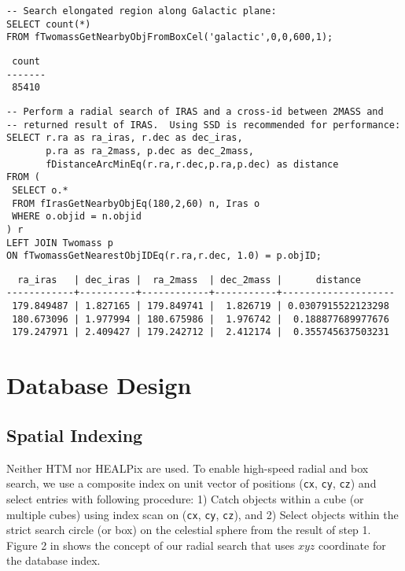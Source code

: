 \begin{verbatim}
-- Search elongated region along Galactic plane:
SELECT count(*) 
FROM fTwomassGetNearbyObjFromBoxCel('galactic',0,0,600,1);
\end{verbatim}

{\small
\begin{verbatim}
 count 
-------
 85410
\end{verbatim}
}

{\small
\begin{verbatim}
-- Perform a radial search of IRAS and a cross-id between 2MASS and
-- returned result of IRAS.  Using SSD is recommended for performance:
SELECT r.ra as ra_iras, r.dec as dec_iras,
       p.ra as ra_2mass, p.dec as dec_2mass,
       fDistanceArcMinEq(r.ra,r.dec,p.ra,p.dec) as distance
FROM (
 SELECT o.*
 FROM fIrasGetNearbyObjEq(180,2,60) n, Iras o
 WHERE o.objid = n.objid
) r
LEFT JOIN Twomass p
ON fTwomassGetNearestObjIDEq(r.ra,r.dec, 1.0) = p.objID;
\end{verbatim}
}

{\small
\begin{verbatim}
  ra_iras   | dec_iras |  ra_2mass  | dec_2mass |      distance      
------------+----------+------------+-----------+--------------------
 179.849487 | 1.827165 | 179.849741 |  1.826719 | 0.0307915522123298
 180.673096 | 1.977994 | 180.675986 |  1.976742 |  0.188877689977676
 179.247971 | 2.409427 | 179.242712 |  2.412174 |  0.355745637503231
\end{verbatim}
}


\section{Database Design}

\subsection{Spatial Indexing}

Neither HTM \citep{kun_2000} nor HEALPix \citep{gor_2005} are used.
To enable high-speed radial and box search,
we use a composite index on unit vector of positions 
({\tt cx}, {\tt cy}, {\tt cz}) and select entries with following procedure:
1) Catch objects within a cube (or multiple cubes) 
using index scan on ({\tt cx}, {\tt cy}, {\tt cz}), and
2) Select objects within the strict search circle (or box) on the celestial
sphere from the result of step 1.
Figure 2 in \citet{yam_2011a} shows the concept of our radial search
that uses $x$$y$$z$ coordinate for the database index.

